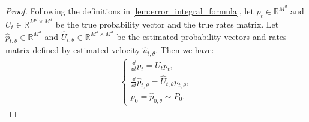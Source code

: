 \documentclass[12pt]{article}
\numberwithin{equation}{section}
\let\hat\widehat
\newcommand{\wh}{\widehat}
\renewcommand{\hat}{\wh}
\def\R{\mathbb{R}}
\theoremstyle{theoremstyle}
\numberwithin{equation}{section}
\numberwithin{theorem}{section}
\numberwithin{proposition}{section}
\numberwithin{definition}{section}
\numberwithin{lemma}{section}
\numberwithin{assumption}{section}
\numberwithin{remark}{section}
\begin{document}
\begin{proof}
Following the definitions in \cref{lem:error_integral_formula},
let $p_t \in \R^{M^d}$ and $U_t \in \R^{M^d \times M^d}$ be the true probability vector and the true rates matrix.
Let $\hat{p}_{t,\theta} \in \R^{M^d}$ and $\hat{U}_{t,\theta} \in \R^{M^d \times M^d}$ be the estimated probability vectors and rates matrix defined by estimated velocity $\hat{u}_{t,\theta}$.
Then we have:
\begin{align*} 
    \begin{cases}
    \frac{\dd}{\dd t}p_t= U_t p_t, \\
    \frac{\dd}{\dd t}\hat{p}_{t,\theta}= \hat{U}_{t,\theta} p_{t,\theta},\\
    p_0= \hat{p}_{0,\theta}\sim P_0.
    \end{cases}
\end{align*}


\end{proof}
\end{document}
